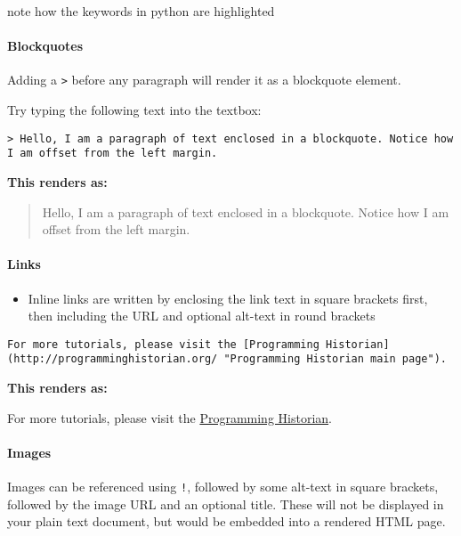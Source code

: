 \documentclass{article}
\providecommand{\tightlist}{%
      \setlength{\itemsep}{0pt}\setlength{\parskip}{0pt}}
\begin{document}
note how the keywords in python are highlighted

    \paragraph{Blockquotes}\label{blockquotes}

Adding a \texttt{\textgreater{}} before any paragraph will render it as
a blockquote element.

Try typing the following text into the textbox:

\begin{verbatim}
> Hello, I am a paragraph of text enclosed in a blockquote. Notice how I am offset from the left margin. 
\end{verbatim}

\textbf{This renders as:}

\begin{quote}
Hello, I am a paragraph of text enclosed in a blockquote. Notice how I
am offset from the left margin.
\end{quote}

    \paragraph{Links}\label{links}

\begin{itemize}
\tightlist
\item
  Inline links are written by enclosing the link text in square brackets
  first, then including the URL and optional alt-text in round brackets
\end{itemize}

\texttt{For\ more\ tutorials,\ please\ visit\ the\ {[}Programming\ Historian{]}(http://programminghistorian.org/\ "Programming\ Historian\ main\ page").}

\textbf{This renders as:}

For more tutorials, please visit the
\href{http://programminghistorian.org/}{Programming Historian}.

    \paragraph{Images}\label{images}

Images can be referenced using \texttt{!}, followed by some alt-text in
square brackets, followed by the image URL and an optional title. These
will not be displayed in your plain text document, but would be embedded
into a rendered HTML page.
\end{document}
